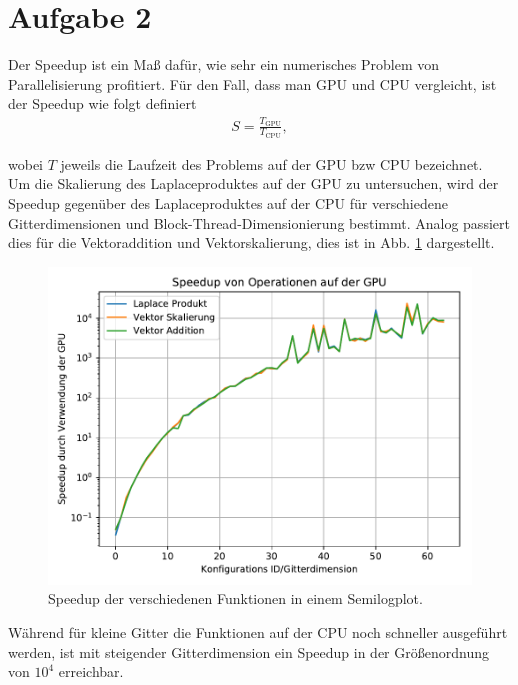 \documentclass[10pt,a4paper]{article}
\begin{document}
\section{Aufgabe 2}

Der Speedup ist ein Maß dafür, wie sehr ein numerisches Problem von Parallelisierung profitiert.
Für den Fall, dass man GPU und CPU vergleicht, ist der Speedup wie folgt definiert
\begin{align*}
  S = \frac{T_\text{GPU}}{T_\text{CPU}},
\end{align*}

wobei $T$ jeweils die Laufzeit des Problems auf der GPU bzw CPU bezeichnet.\\

Um die Skalierung des Laplaceproduktes auf der GPU zu untersuchen, wird der Speedup gegenüber 
des Laplaceproduktes auf der CPU für verschiedene Gitterdimensionen und 
Block-Thread-Dimensionierung bestimmt. Analog passiert dies für die Vektoraddition und Vektorskalierung, dies ist in Abb. \ref{fig:speedup} dargestellt.

\begin{figure}[H]
  \centering
  \includegraphics[width=.85\textwidth]{../aufg2/figures/speedup.pdf}
  \caption{
    Speedup der verschiedenen Funktionen in einem Semilogplot. 
  }
  \label{fig:speedup}
\end{figure}

Während für kleine Gitter die Funktionen auf der CPU noch schneller ausgeführt werden, ist mit steigender Gitterdimension ein Speedup in der Größenordnung von $10^4$ erreichbar.
\end{document}
